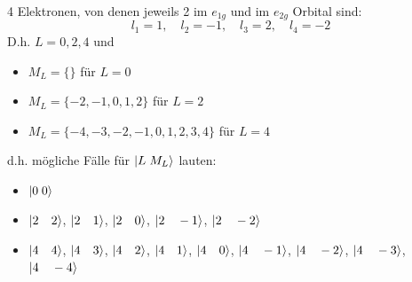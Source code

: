 \documentclass[12pt,a4paper]{article}
\begin{document}
 4 Elektronen, von denen jeweils 2 im $e_{1g}$ und im $e_{2g}$ Orbital sind:
 $$ l_1 = 1,\quad l_2 = -1, \quad l_3 = 2, \quad l_4 = -2$$
 D.h. $L = {0, 2, 4}$ und 
 \begin{itemize}
 \item $M_L  = \{ \}$ für $L = 0$
 \item $M_L  = \{ -2, -1, 0, 1, 2 \}$ für $L = 2$
 \item $M_L  = \{ -4, -3, -2, -1, 0, 1, 2, 3, 4\}$ für $L = 4$
 \end{itemize}
 d.h. mögliche Fälle für $\ket{L \; M_L}$ lauten: 
 \begin{itemize}
 \item $\ket{ 0 \; 0}$ 
 \item $\ket{2 \quad 2}$, $\ket{2 \quad 1}$, $\ket{2 \quad 0}$, $\ket{2 \quad-1}$, $\ket{2 \quad -2}$
 \item $\ket{4\quad 4}$, $\ket{4\quad 3}$, $\ket{4\quad 2}$, $\ket{4\quad 1}$, $\ket{4\quad 0}$, $\ket{4\quad -1}$, $\ket{4\quad -2}$, $\ket{4\quad -3}$, $\ket{4\quad -4}$
 \end{itemize}
 
\end{document}
